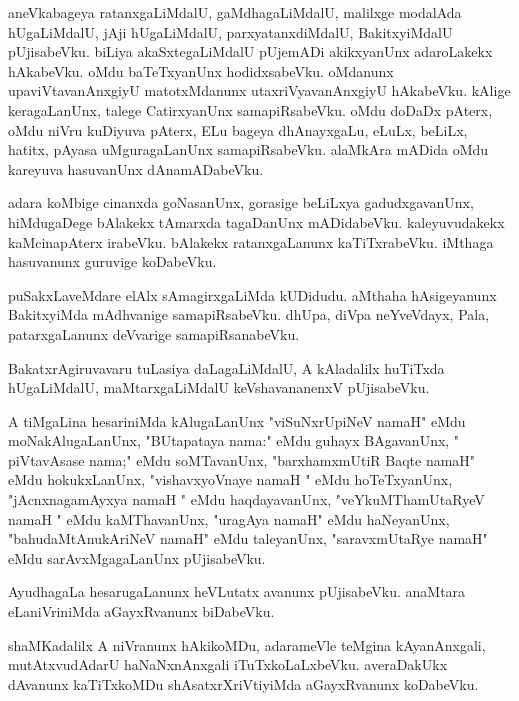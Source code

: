 \documentclass{article}
\begin{document}
\begin{mn}%
aneVkabageya ratanxgaLiMdalU, gaMdhagaLiMdalU, malilxge modalAda hUgaLiMdalU, jAji hUgaLiMdalU, 
parxyatanxdiMdalU, BakitxyiMdalU pUjisabeVku. biLiya akaSxtegaLiMdalU pUjemADi akikxyanUnx 
adaroLakekx hAkabeVku. oMdu baTeTxyanUnx hodidxsabeVku. oMdanunx upaviVtavanAnxgiyU matotxMdanunx 
utaxriVyavanAnxgiyU hAkabeVku. kAlige keragaLanUnx, talege CatirxyanUnx samapiRsabeVku. oMdu 
doDaDx pAterx, oMdu niVru kuDiyuva pAterx, ELu bageya dhAnayxgaLu, eLuLx, beLiLx, hatitx, pAyasa 
uMguragaLanUnx samapiRsabeVku. alaMkAra mADida oMdu kareyuva hasuvanUnx dAnamADabeVku.
\end{mn}

\begin{mn}%
adara koMbige cinanxda goNasanUnx, gorasige beLiLxya gadudxgavanUnx, hiMdugaDege bAlakekx tAmarxda 
tagaDanUnx mADidabeVku. kaleyuvudakekx kaMcinapAterx irabeVku. bAlakekx ratanxgaLanunx 
kaTiTxrabeVku. iMthaga hasuvanunx guruvige koDabeVku.
\end{mn}

\begin{mn}%
puSakxLaveMdare elAlx sAmagirxgaLiMda kUDidudu. aMthaha hAsigeyanunx BakitxyiMda mAdhvanige 
samapiRsabeVku. dhUpa, diVpa neYveVdayx, Pala, patarxgaLanunx deVvarige samapiRsanabeVku.
\end{mn}

\begin{mn}%
BakatxrAgiruvavaru tuLasiya daLagaLiMdalU, A kAladalilx huTiTxda hUgaLiMdalU, maMtarxgaLiMdalU 
keVshavananenxV pUjisabeVku.
\end{mn}

\begin{mn}%
A tiMgaLina hesariniMda kAlugaLanUnx "viSuNxrUpiNeV namaH" eMdu moNakAlugaLanUnx, "BUtapataya nama:"
eMdu guhayx BAgavanUnx, " piVtavAsase nama;" eMdu soMTavanUnx, "barxhamxmUtiR Baqte namaH" eMdu 
hokukxLanUnx, "vishavxyoVnaye namaH " eMdu hoTeTxyanUnx, "jAcnxnagamAyxya namaH " eMdu 
haqdayavanUnx, "veYkuMThamUtaRyeV namaH " eMdu kaMThavanUnx, "uragAya namaH" eMdu haNeyanUnx, 
"bahudaMtAnukAriNeV namaH" eMdu taleyanUnx, "saravxmUtaRye namaH" eMdu sarAvxMgagaLanUnx 
pUjisabeVku.
\end{mn}

\begin{mn}%
AyudhagaLa hesarugaLanunx heVLutatx avanunx pUjisabeVku. anaMtara eLaniVriniMda aGayxRvanunx 
biDabeVku.
\end{mn}

\begin{mn}%
shaMKadalilx A niVranunx hAkikoMDu, adarameVle teMgina kAyanAnxgali, mutAtxvudAdarU haNaNxnAnxgali 
iTuTxkoLaLxbeVku. averaDakUkx dAvanunx kaTiTxkoMDu shAsatxrXriVtiyiMda aGayxRvanunx koDabeVku.
\end{mn}
\end{document}
